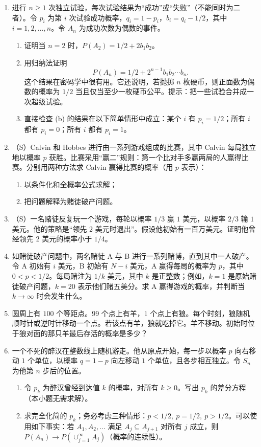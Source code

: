 \documentclass[UTF8,12pt,a4paper,fontset=fandol]{ctexart}
\begin{document}
\begin{enumerate}
  \item 进行 $n\ge 1$ 次独立试验，每次试验结果为“成功”或“失败”（不能同时为二者）。令 $p_i$ 为第 $i$ 次试验成功概率，$q_i=1-p_i$，$b_i=q_i-1/2$，其中 $i=1,2,\ldots,n$。令 $A_n$ 为成功次数为偶数的事件。
  \begin{enumerate}
    \item 证明当 $n=2$ 时，$P(A_2)=1/2+2b_1b_2$。
    \item 用归纳法证明
    \[
      P(A_n)=1/2+2^{n-1}b_1b_2\cdots b_n.
    \]
    这个结果在密码学中很有用。它还说明，若抛掷 $n$ 枚硬币，则正面数为偶数的概率为 $1/2$ 当且仅当至少一枚硬币公平。提示：把一些试验合并成一次超级试验。
    \item 直接检查 (b) 的结果在以下简单情形中成立：某个 $i$ 有 $p_i=1/2$；所有 $i$ 都有 $p_i=0$；所有 $i$ 都有 $p_i=1$。
  \end{enumerate}

  \item （S）Calvin 和 Hobbes 进行由一系列游戏组成的比赛，其中 Calvin 每局独立地以概率 $p$ 获胜。比赛采用“赢二”规则：第一个比对手多赢两局的人赢得比赛。分别用两种方法求 Calvin 赢得比赛的概率（用 $p$ 表示）：
  \begin{enumerate}
    \item 以条件化和全概率公式求解；
    \item 把问题解释为赌徒破产问题。
  \end{enumerate}

  \item （S）一名赌徒反复玩一个游戏，每轮以概率 $1/3$ 赢 $1$ 美元，以概率 $2/3$ 输 $1$ 美元。他的策略是“领先 $2$ 美元时退出”。假设他初始有一百万美元。证明他曾经领先 $2$ 美元的概率小于 $1/4$。

  \item 如赌徒破产问题中，两名赌徒 A 与 B 进行一系列赌博，直到其中一人破产。令 A 初始有 $i$ 美元，B 初始有 $N-i$ 美元，A 赢得每局的概率为 $p$，其中 $0<p<1/2$。每局赌注为 $1/k$ 美元，其中 $k$ 是正整数；例如，$k=1$ 是原始赌徒破产问题，$k=20$ 表示他们赌五美分。求 A 赢得游戏的概率，并判断当 $k\to\infty$ 时会发生什么。

  \item 圆周上有 $100$ 个等距点。$99$ 个点上有羊，$1$ 个点上有狼。每个时刻，狼随机顺时针或逆时针移动一个点。若该点有羊，狼就吃掉它。羊不移动。初始时位于狼对面的那只羊最后存活的概率是多少？

  \item 一个不死的醉汉在整数线上随机游走。他从原点开始，每一步以概率 $p$ 向右移动 $1$ 个单位，以概率 $q=1-p$ 向左移动 $1$ 个单位，且各步相互独立。令 $S_n$ 为他第 $n$ 步后的位置。
  \begin{enumerate}
    \item 令 $p_k$ 为醉汉曾经到达值 $k$ 的概率，对所有 $k\ge 0$。写出 $p_k$ 的差分方程（本小题无需求解）。
    \item 求完全化简的 $p_k$；务必考虑三种情形：$p<1/2,\ p=1/2,\ p>1/2$。可以使用如下事实：若 $A_1,A_2,\ldots$ 满足 $A_j\subseteq A_{j+1}$ 对所有 $j$ 成立，则 $P(A_n)\to P(\cup_{j=1}^\infty A_j)$（概率的连续性）。
  \end{enumerate}


\end{enumerate}
\end{document}

